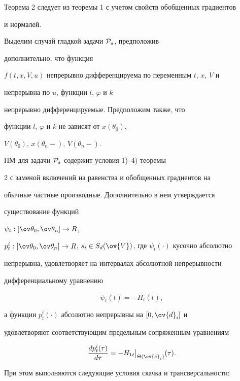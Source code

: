 Теорема 2 следует из теоремы 1 с учетом свойств обобщенных градиентов


и нормалей.





Выделим случай гладкой задачи ${\cal P}_{s}$, предположив


дополнительно, что функция


$f(t,x,V,u)$ непрерывно дифференцируема по переменным $t$, $x$, $V$ и


непрерывна по $u$, функции $l$, $\varphi$ и $k$


непрерывно дифференцируемые. Предположим также, что


функции $l$, $\varphi$ и $k$ не зависят от $x(\theta_0)$,


$V(\theta_0)$, $x(\theta_n-)$, $V(\theta_n-)$.





ПМ для задачи ${\cal P}_{s}$ содержит условия 1)--4) теоремы


2 с заменой включений на равенства и обобщенных градиентов на


обычные частные производные. Дополнительно в нем утверждается


существование функций


$\psi_t:[\ov\theta_0,\ov\theta_n]\rightarrow R$,


$p_t^i:[\ov\theta_0,\ov\theta_n]\rightarrow R$, $ s_i \in


S_d(\ov{V})$, где $\psi_t(\cdot)$ кусочно абсолютно


непрерывна, удовлетворяет на интервалах абсолютной непрерывности


дифференциальному уравнению


$$


\Dot{\psi}_t(t)=- {H}_t(t),


$$


а функции $p_t^i(\cdot)$ абсолютно непрерывны на $[0,\ov{d}_i]$ и


удовлетворяют соответствующим предельным сопряженным уравнениям


$$


\frac{dp_t^i(\tau)}{d\tau}=- {H}_{1t} \big|_{


\Theta(\ov{s}_i)}(\tau).


$$


При этом выполняются следующие условия скачка и трансверсальности:



